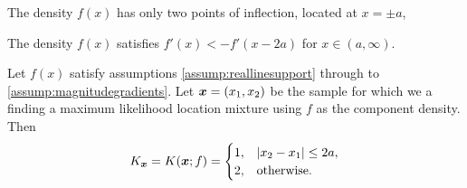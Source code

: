 		\begin{assumption}
			The density $f(x)$ has only two points of inflection, located at $x = \pm a$,
			\label{assump:twoinflectionpoints}
		\end{assumption}


			
		
		\begin{assumption}
			The density $f(x)$ satisfies $f'(x) < -f'(x - 2a)$ for $x \in (a,\infty)$.
			\label{assump:magnitudegradients}
		\end{assumption}

		\begin{theorem}
			\label{thm:n=2 inflection result}
			Let $f(x)$ satisfy assumptions \ref{assump:reallinesupport} through to \ref{assump:magnitudegradients}. Let ${\bm{{x}}} = (x_1,x_2)$ be the sample for which we a finding a maximum likelihood location mixture using $f$ as the component density. Then 
			\begin{equation}
				K_{\bm{{x}}} = K({\bm{{x}}};f) = 
					\begin{cases}
						1, &|x_2 - x_1| \leq 2a,\\
						2, &\text{otherwise.}
					\end{cases}
			\end{equation}
		\end{theorem}

